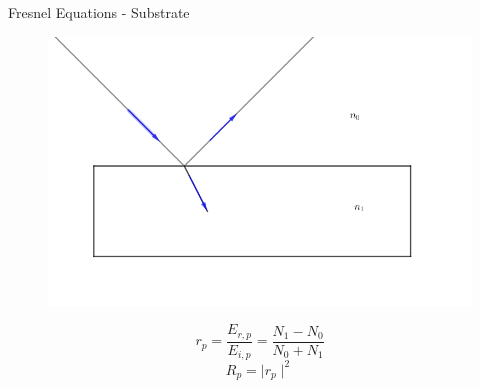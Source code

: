 \documentclass[10pt]{beamer}
\begin{document}
\begin{frame}{Fresnel Equations - Substrate}

		\begin{figure}
			\hfill\includegraphics[width = \textwidth]{subrefl.png}\hspace*{\fill}
		\end{figure}
		\begin{equation*}
			r_p = \frac{E_{r,p}}{E_{i,p}} = \frac{N_1-N_0}{N_0+N_1}
		\end{equation*}
		\begin{equation*}
			R_p = \mid r_p \mid ^2 
		\end{equation*}

	

\end{frame}
	
\end{document}
